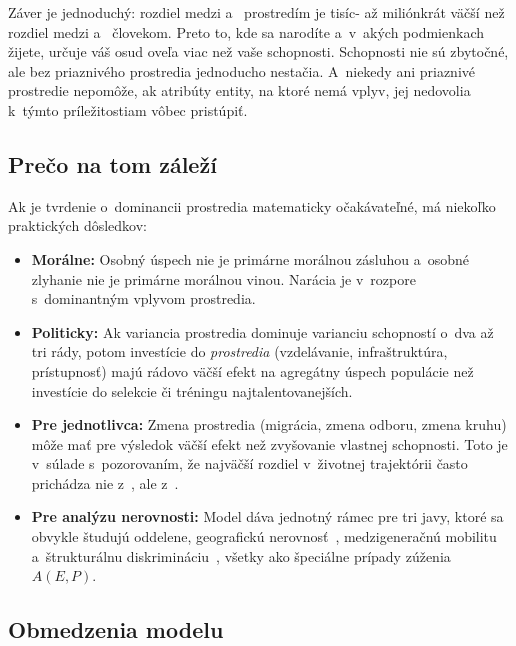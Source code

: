 \documentclass[12pt,a4paper]{article}
\begin{document}
Záver je jednoduchý: rozdiel medzi  a~ prostredím je tisíc- až miliónkrát väčší než rozdiel medzi  a~ človekom. Preto to, kde sa narodíte a~v~akých podmienkach žijete, určuje váš osud oveľa viac než vaše schopnosti. Schopnosti nie sú zbytočné, ale bez priaznivého prostredia jednoducho nestačia. A~niekedy ani priaznivé prostredie nepomôže, ak atribúty entity, na ktoré nemá vplyv, jej nedovolia k~týmto príležitostiam vôbec pristúpiť.

\subsection{Prečo na tom záleží}

Ak je tvrdenie o~dominancii prostredia matematicky očakávateľné, má niekoľko praktických dôsledkov:

\begin{itemize}
    \item \textbf{Morálne:} Osobný úspech nie je primárne morálnou zásluhou a~osobné zlyhanie nie je primárne morálnou vinou. Narácia  je v~rozpore s~dominantným vplyvom prostredia.
    \item \textbf{Politicky:} Ak variancia prostredia dominuje varianciu schopností o~dva až tri rády, potom investície do \emph{prostredia} (vzdelávanie, infraštruktúra, prístupnosť) majú rádovo väčší efekt na agregátny úspech populácie než investície do selekcie či tréningu najtalentovanejších.
    \item \textbf{Pre jednotlivca:} Zmena prostredia (migrácia, zmena odboru, zmena kruhu) môže mať pre výsledok väčší efekt než zvyšovanie vlastnej schopnosti. Toto je v~súlade s~pozorovaním, že najväčší rozdiel v~životnej trajektórii často prichádza nie z~, ale z~.
    \item \textbf{Pre analýzu nerovnosti:} Model dáva jednotný rámec pre tri javy, ktoré sa obvykle študujú oddelene, geografickú nerovnosť~\cite{milanovic2015}, medzigeneračnú mobilitu~\cite{chetty2014} a~štrukturálnu diskrimináciu~\cite{bourdieu1986}, všetky ako špeciálne prípady zúženia $A(E,P)$.
\end{itemize}

\subsection{Obmedzenia modelu}
\end{document}
